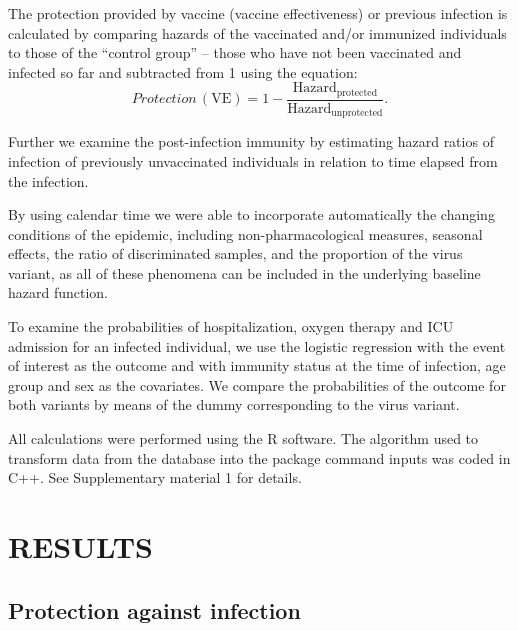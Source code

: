 \documentclass[a4paper,12pt]{article}
\begin{document}
The protection provided by vaccine (vaccine effectiveness) or previous infection is calculated by comparing hazards of the vaccinated and/or immunized individuals to those of the  ``control group'' -- those who have not been vaccinated and infected so far and subtracted from 1 using the equation:
\begin{equation}
Protection\, (\mbox{VE}) = 1 -  \frac{\mathrm{Hazard_{protected}}}{\mathrm{Hazard_{unprotected}}}.
\label{eq1}
\end{equation}

Further we examine the post-infection immunity by estimating hazard ratios of infection of previously unvaccinated individuals in relation to time elapsed from the infection. 

By using calendar time we were able to incorporate automatically  the changing conditions of the epidemic, including non-pharmacological measures, seasonal effects, the ratio of discriminated samples, and the proportion of the virus variant, as all of these phenomena can be included in the underlying baseline hazard function. 

To examine the probabilities of hospitalization, oxygen therapy and ICU admission for an infected individual, we use the logistic regression with the event of interest as the outcome and with immunity status at the time of infection, age group and sex as the covariates. We compare the probabilities of the outcome for both  variants by means of the dummy corresponding to the virus variant.

 
All calculations were performed using the R software. The algorithm used to transform data from the database into the package command inputs was coded in C++. See Supplementary material 1 for details. 



\section*{RESULTS}
\label{sec3}

\subsection*{Protection against infection}
\end{document}
